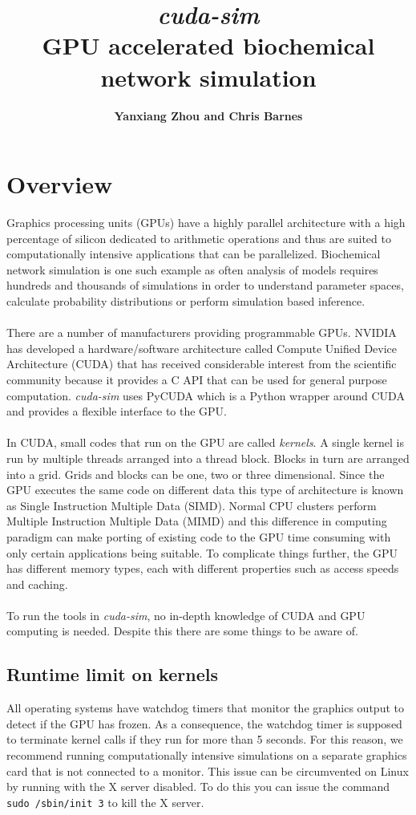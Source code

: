 \documentclass [11pt, a4paper, openany, twoside=off] {article}
\title{ \emph{cuda-sim} \\ GPU accelerated biochemical network simulation}
\author{{\bf Yanxiang Zhou and Chris Barnes} }
\begin{document}
\maketitle

\newpage\tableofcontents\newpage

\section{Overview}
Graphics processing units (GPUs) have a highly parallel architecture with a high percentage of silicon dedicated to arithmetic operations and thus are suited to computationally intensive applications that can be parallelized. Biochemical network simulation is one such example as often analysis of models requires hundreds and thousands of simulations in order to understand parameter spaces, calculate probability distributions or perform simulation based inference.
\\
\\
There are a number of manufacturers providing programmable GPUs. NVIDIA has developed a hardware/software architecture called Compute Unified Device Architecture (CUDA) that has received considerable interest from the scientific community because it provides a C API that can be used for general purpose computation. {\it cuda-sim} uses PyCUDA which is a Python wrapper around CUDA and provides a flexible interface to the GPU.
\\
\\
In CUDA, small codes that run on the GPU are called {\it kernels}. A single kernel is run by multiple threads arranged into a thread block. Blocks in turn are arranged into a grid. Grids and blocks can be one, two or three dimensional. Since the GPU executes the same code on different data this type of architecture is known as Single Instruction Multiple Data (SIMD). Normal CPU clusters perform Multiple Instruction Multiple Data (MIMD) and this difference in computing paradigm can make porting of existing code to the GPU time consuming with only certain applications being suitable. To complicate things further, the GPU has different memory types, each with different properties such as access speeds and caching.
\\
\\
To run the tools in {\it cuda-sim}, no in-depth knowledge of CUDA and GPU computing is needed. Despite this there are some things to be aware of.
\subsection{Runtime limit on kernels}
All operating systems have watchdog timers that monitor the graphics output to detect if the GPU has frozen. As a consequence, the watchdog timer is supposed to terminate kernel calls if they run for more than 5 seconds. For this reason, we recommend running computationally intensive simulations on a separate graphics card that is not connected to a monitor. This issue can be circumvented on Linux by running with the X server disabled. To do this you can issue the command \verb$ sudo /sbin/init 3$ to kill the X server. 
\end{document}
